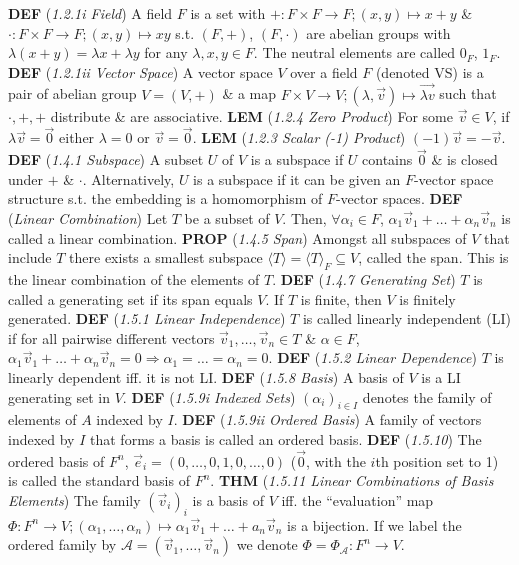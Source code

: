 \documentclass{article}
\newcommand{\wde}[1]{\textcolor{defc}{\textbf{DEF}} (\textcolor{namec}{\textit{#1}})}
\newcommand{\wl}[1]{\textcolor{lemc}{\textbf{LEM}} (\textcolor{namec}{\textit{#1}})}
\newcommand{\wpr}[1]{\textcolor{propc}{\textbf{PROP}} (\textcolor{namec}{\textit{#1}})}
\newcommand{\wt}[1]{\textcolor{thmc}{\textbf{THM}} (\textcolor{namec}{\textit{#1}})}
\begin{document}
\begin{multicols}{2}

  \noindent %
  \wde{1.2.1i Field} A field $F$ is a set with $+ : F \times F \to F; (x, y) \mapsto x + y$ \& $\cdot : F \times F \to F; (x, y) \mapsto xy$ s.t. $(F,+)$, $(F,\cdot)$ are abelian groups with $\lambda(x + y) = \lambda x + \lambda y$  for any $\lambda, x, y \in F$. The neutral elements are called $0_{F}$, $1_{F}$.
  \wde{1.2.1ii Vector Space} A vector space $V$ over a field $F$ (denoted VS) is a pair of abelian group $V=(V, +)$ \& a map $F \times V \to V; (\lambda, \vec{v}) \mapsto \vec{\lambda v}$ such that $\cdot,+,+$ distribute \& are associative.
  \wl{1.2.4 Zero Product} For some $\vec{v} \in V$, if $\lambda\vec{v} = \vec{0}$ either $\lambda=0$ or $\vec{v}=\vec{0}$.
  \wl{1.2.3 Scalar (-1) Product} $(-1)\vec{v} = -\vec{v}$.
  \wde{1.4.1 Subspace} A subset $U$ of $V$ is a subspace if $U$ contains $\vec{0}$ \& is closed under $+$ \& $\cdot$. Alternatively, $U$ is a subspace if it can be given an $F$-vector space structure s.t. the embedding is a homomorphism of $F$-vector spaces.
  \wde{Linear Combination} Let $T$ be a subset of $V$. Then, $\forall \alpha_{i} \in F$, $\alpha_{1}\vec{v}_{1} + \dots + \alpha_{n}\vec{v}_{n}$ is called a linear combination.
  \wpr{1.4.5 Span} Amongst all subspaces of $V$ that include $T$ there exists a smallest subspace $\langle T \rangle = \langle T \rangle_{F} \subseteq V$, called the span. This is the linear combination of the elements of $T$.
  \wde{1.4.7 Generating Set} $T$ is called a generating set if its span equals $V$. If $T$ is finite, then $V$ is finitely generated.
  \wde{1.5.1 Linear Independence} $T$ is called linearly independent (LI) if for all pairwise different vectors $\vec{v}_{1},\dots,\vec{v}_{n} \in T$ \& $\alpha \in F$, $\alpha_{1}\vec{v}_{1} + \dots + \alpha_{n}\vec{v}_{n} = 0 \Rightarrow \alpha_{1} = \dots = \alpha_{n} = 0$.
  \wde{1.5.2 Linear Dependence} $T$ is linearly dependent iff. it is not LI.
  \wde{1.5.8 Basis} A basis of $V$ is a LI generating set in $V$.
  \wde{1.5.9i Indexed Sets} $(\alpha_{i})_{i \in I}$ denotes the family of elements of $A$ indexed by $I$.
  \wde{1.5.9ii Ordered Basis} A family of vectors indexed by $I$ that forms a basis is called an ordered basis.
  \wde{1.5.10} The ordered basis of $F^{n}$, $\vec{e}_{i} = (0,\dots,0,1,0,\dots,0)$ ($\vec{0}$, with the $i$th position set to 1) is called the standard basis of $F^{n}$.
  \wt{1.5.11 Linear Combinations of Basis Elements} The family $(\vec{v}_{i})_{i}$ is a basis of $V$ iff. the ``evaluation'' map $\Phi : F^{n} \to V; (\alpha_{1}, \dots, \alpha_{n}) \mapsto \alpha_{1}\vec{v}_{1} + \dots + a_{n}\vec{v}_{n}$ is a bijection. If we label the ordered family by $\mathcal{A} = (\vec{v}_{1}, \dots, \vec{v}_{n})$ we denote $\Phi = \Phi_{\mathcal{A}} : F^{n} \to V$.

\end{multicols}
\end{document}
